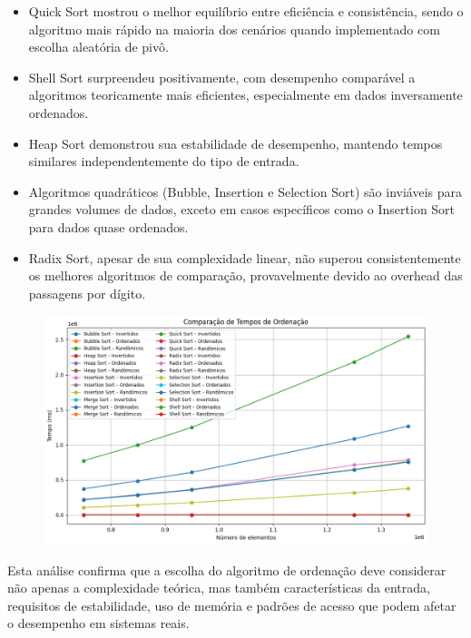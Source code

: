 \documentclass[a4paper, 12pt]{article}
\begin{document}
            \begin{itemize}
                \item Quick Sort mostrou o melhor equilíbrio entre eficiência e consistência, sendo o algoritmo mais rápido na maioria dos cenários quando implementado com escolha aleatória de pivô.
                \item Shell Sort surpreendeu positivamente, com desempenho comparável a algoritmos teoricamente mais eficientes, especialmente em dados inversamente ordenados.
                \item Heap Sort demonstrou sua estabilidade de desempenho, mantendo tempos similares independentemente do tipo de entrada.
                \item Algoritmos quadráticos (Bubble, Insertion e Selection Sort) são inviáveis para grandes volumes de dados, exceto em casos específicos como o Insertion Sort para dados quase ordenados.
                \item Radix Sort, apesar de sua complexidade linear, não superou consistentemente os melhores algoritmos de comparação, provavelmente devido ao overhead das passagens por dígito.
            \end{itemize}

            \begin{figure}[ht]
                \centering
                \includegraphics[width=1\textwidth]{images/tudoqueda.png}
            \end{figure}


        Esta análise confirma que a escolha do algoritmo de ordenação deve considerar não apenas a complexidade teórica, mas também características da entrada, requisitos de estabilidade, uso de memória e padrões de acesso que podem afetar o desempenho em sistemas reais.
\end{document}
